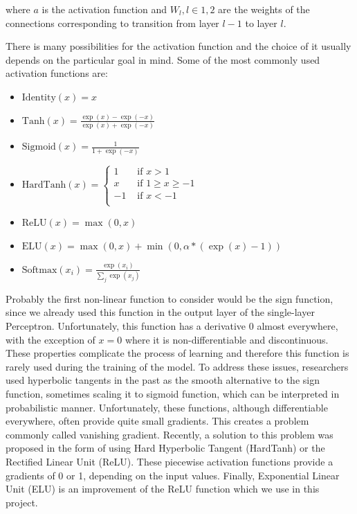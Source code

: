 where $a$ is the activation function and $W_l, l \in {1, 2}$ are the weights of the connections corresponding to transition from layer $l-1$ to layer $l$.

There is many possibilities for the activation function and the choice of it usually depends on the particular goal in mind.
Some of the most commonly used activation functions are:

\begin{itemize}
    \item $\text{Identity}(x) = x$
    \item $\text{Tanh}(x) = \frac{\exp(x) - \exp(-x)}{\exp(x) + \exp(-x)}$
    \item $\text{Sigmoid}(x) = \frac{1}{1 + \exp(-x)}$
    \item $\text{HardTanh}(x) = \begin{cases}
             1 & \text{ if } x > 1 \\
             x & \text{ if } 1 \geq x \geq -1 \\
            -1 & \text{ if } x < -1 \\
          \end{cases}$
    \item $\text{ReLU}(x) = \max(0, x)$
    \item $\text{ELU}(x) = \max(0,x) + \min(0, \alpha * (\exp(x) - 1))$
    \item $\text{Softmax}(x_{i}) = \frac{\exp(x_i)}{\sum_j \exp(x_j)}$
    \label{list:activations}
\end{itemize}


Probably the first non-linear function to consider would be the sign function, since we already used this function in the output layer of the single-layer Perceptron.
Unfortunately, this function has a derivative 0 almost everywhere, with the exception of $x=0$ where it is non-differentiable and discontinuous.
These properties complicate the process of learning and therefore this function is rarely used during the training of the model.
To address these issues, researchers used hyperbolic tangents in the past as the smooth alternative to the sign function, sometimes scaling it to sigmoid function, which can be interpreted in probabilistic manner.
Unfortunately, these functions, although differentiable everywhere, often provide quite small gradients.
This creates a problem commonly called vanishing gradient.
Recently, a solution to this problem was proposed in the form of using Hard Hyperbolic Tangent (HardTanh) or the Rectified Linear Unit (ReLU).
These piecewise activation functions provide a gradients of 0 or 1, depending on the input values.
Finally, Exponential Linear Unit (ELU) is an improvement of the ReLU function which we use in this project. 
